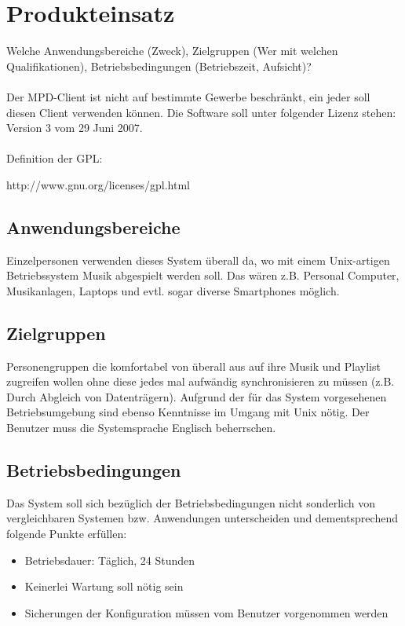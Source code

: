 \section{Produkteinsatz}
Welche Anwendungsbereiche (Zweck), Zielgruppen (Wer mit welchen Qualifikationen), Betriebsbedingungen (Betriebszeit,
Aufsicht)?\ \\ \\
Der MPD-Client ist nicht auf bestimmte Gewerbe beschränkt, ein jeder soll diesen Client
verwenden können. 
Die Software soll unter folgender Lizenz stehen:
Version 3 vom 29 Juni 2007.\ \\ \\
Definition der GPL:
\begin{center}
http://www.gnu.org/licenses/gpl.html
\end{center}
\subsection{Anwendungsbereiche}
Einzelpersonen verwenden dieses System überall da, wo mit
einem Unix-artigen Betriebssystem Musik abgespielt werden soll.
Das wären z.B. Personal Computer, Musikanlagen, Laptops und evtl.
sogar diverse Smartphones möglich.

\subsection{Zielgruppen}
Personengruppen die komfortabel von überall aus auf ihre Musik und Playlist zugreifen
wollen ohne diese jedes mal aufwändig synchronisieren zu müssen (z.B. Durch Abgleich von Datenträgern). 
Aufgrund der für das System vorgesehenen Betriebsumgebung sind ebenso Kenntnisse im Umgang mit Unix nötig. 
Der Benutzer muss die Systemsprache Englisch beherrschen.


\subsection{Betriebsbedingungen}
Das System soll sich bezüglich der Betriebsbedingungen nicht sonderlich von vergleichbaren Systemen bzw.
Anwendungen unterscheiden und dementsprechend folgende Punkte erfüllen:
\begin{itemize}
        \item Betriebsdauer: Täglich, 24 Stunden
        \item Keinerlei Wartung soll nötig sein
        \item Sicherungen der Konfiguration müssen vom Benutzer vorgenommen werden
\end{itemize}

